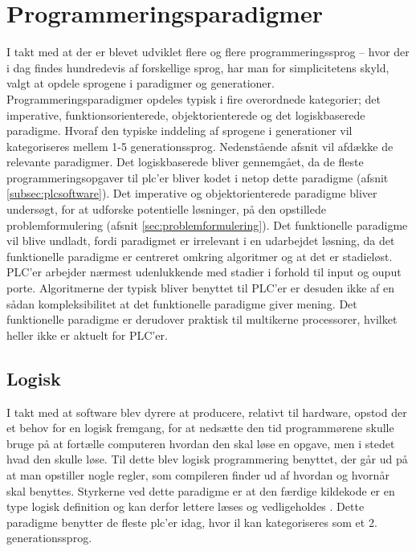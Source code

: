 \section{Programmeringsparadigmer}\label{sec:paradigmer}\label{ssec:hovedparadigmer}

I takt med at der er blevet udviklet flere og flere programmeringssprog – hvor der i dag findes hundredevis af forskellige sprog, har man for simplicitetens skyld, valgt at opdele sprogene i paradigmer og generationer. Programmeringsparadigmer opdeles typisk i fire overordnede kategorier; det imperative, funktionsorienterede, objektorienterede og det logiskbaserede paradigme. Hvoraf den typiske inddeling af sprogene i generationer vil kategoriseres mellem 1-5 generationssprog. Nedenstående afsnit vil afdække de relevante paradigmer. Det logiskbaserede bliver gennemgået, da de fleste programmeringsopgaver til \gls{plc}’er bliver kodet i netop dette paradigme (afsnit \ref{subsec:plcsoftware}). Det imperative og objektorienterede paradigme bliver undersøgt, for at udforske potentielle løsninger, på den opstillede problemformulering (afsnit \ref{sec:problemformulering}). Det funktionelle paradigme vil blive undladt, fordi paradigmet er irrelevant i en udarbejdet løsning, da det funktionelle paradigme er centreret omkring algoritmer og at det er stadieløst. PLC'er arbejder nærmest udenlukkende med stadier i forhold til input og ouput porte. Algoritmerne der typisk bliver benyttet til PLC'er er desuden ikke af en sådan kompleksibilitet at det funktionelle paradigme giver mening. Det funktionelle paradigme er derudover praktisk til multikerne processorer, hvilket heller ikke er aktuelt for PLC'er. \cite{functprog}

\tocless \subsection{Logisk}
I takt med at software blev dyrere at producere, relativt til hardware, opstod der et behov for en logisk fremgang, for at nedsætte den tid programmørene skulle bruge på at fortælle computeren hvordan den skal løse en opgave, men i stedet hvad den skulle løse. Til dette blev logisk programmering benyttet, der går ud på at man opstiller nogle regler, som compileren finder ud af hvordan og hvornår skal benyttes. Styrkerne ved dette paradigme er at den færdige kildekode er en type logisk definition og kan derfor lettere læses og vedligeholdes \cite[kapitel 16]{Sebesta_2013}. Dette paradigme benytter de fleste \gls{plc}'er idag, hvor \gls{il} kan kategoriseres som et 2. generationssprog.

